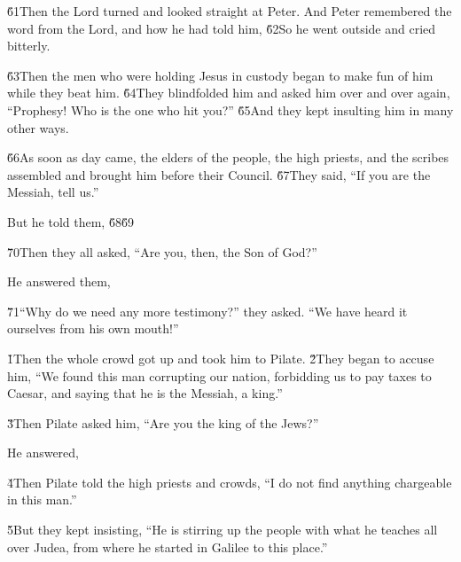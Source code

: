 \v{61}Then the Lord turned and looked straight at Peter. And Peter remembered the word from the Lord, and how he had told him,  \v{62}So he went outside and cried bitterly.

\v{63}Then the men who were holding Jesus in custody began to make fun of him while they beat him. \v{64}They blindfolded him and asked him over and over again, ``Prophesy! Who is the one who hit you?'' \v{65}And they kept insulting him in many other ways.

\v{66}As soon as day came, the elders of the people, the high priests, and the scribes assembled and brought him before their Council. \v{67}They said, ``If you are the Messiah, tell us.''

But he told them,  \v{68}\v{69}

\v{70}Then they all asked, ``Are you, then, the Son of God?''

He answered them, \red{---}

\v{71}``Why do we need any more testimony?'' they asked. ``We have heard it ourselves from his own mouth!''

\v{1}Then the whole crowd got up and took him to Pilate. \v{2}They began to accuse him, ``We found this man corrupting our nation, forbidding us to pay taxes to Caesar, and saying that he is the Messiah, a king.''

\v{3}Then Pilate asked him, ``Are you the king of the Jews?''

He answered, 

\v{4}Then Pilate told the high priests and crowds, ``I do not find anything chargeable in this man.''

\v{5}But they kept insisting, ``He is stirring up the people with what he teaches all over Judea, from where he started in Galilee to this place.''

